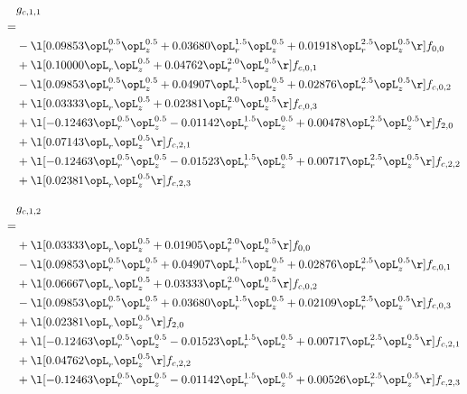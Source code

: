 \begin{alignat}{2} 
\label{eq:g_11_0} 
& g_{c,1,1} \nonumber \\ 
 = \\ 
& - \l[  0.09853 \opL_r^{0.5} \opL_z^{0.5} +  0.03680 \opL_r^{1.5} \opL_z^{0.5} +  0.01918 \opL_r^{2.5} \opL_z^{0.5}  \r] f_{0,0} \nonumber \\ 
& + \l[  0.10000 \opL_r \opL_z^{0.5} +  0.04762 \opL_r^{2.0} \opL_z^{0.5}  \r] f_{c,0,1} \nonumber \\ 
& - \l[  0.09853 \opL_r^{0.5} \opL_z^{0.5} +  0.04907 \opL_r^{1.5} \opL_z^{0.5} +  0.02876 \opL_r^{2.5} \opL_z^{0.5}  \r] f_{c,0,2} \nonumber \\ 
& + \l[  0.03333 \opL_r \opL_z^{0.5} +  0.02381 \opL_r^{2.0} \opL_z^{0.5}  \r] f_{c,0,3} \nonumber \\ 
& + \l[  -0.12463 \opL_r^{0.5} \opL_z^{0.5}   -0.01142 \opL_r^{1.5} \opL_z^{0.5} +  0.00478 \opL_r^{2.5} \opL_z^{0.5}  \r] f_{2,0} \nonumber \\ 
& + \l[  0.07143 \opL_r \opL_z^{0.5}  \r] f_{c,2,1} \nonumber \\ 
& + \l[  -0.12463 \opL_r^{0.5} \opL_z^{0.5}   -0.01523 \opL_r^{1.5} \opL_z^{0.5} +  0.00717 \opL_r^{2.5} \opL_z^{0.5}  \r] f_{c,2,2} \nonumber \\ 
& + \l[  0.02381 \opL_r \opL_z^{0.5}  \r] f_{c,2,3} \nonumber \\ 
\end{alignat} 


\begin{alignat}{2} 
\label{eq:g_12_0} 
& g_{c,1,2} \nonumber \\ 
 = \\ 
& + \l[  0.03333 \opL_r \opL_z^{0.5} +  0.01905 \opL_r^{2.0} \opL_z^{0.5}  \r] f_{0,0} \nonumber \\ 
& - \l[  0.09853 \opL_r^{0.5} \opL_z^{0.5} +  0.04907 \opL_r^{1.5} \opL_z^{0.5} +  0.02876 \opL_r^{2.5} \opL_z^{0.5}  \r] f_{c,0,1} \nonumber \\ 
& + \l[  0.06667 \opL_r \opL_z^{0.5} +  0.03333 \opL_r^{2.0} \opL_z^{0.5}  \r] f_{c,0,2} \nonumber \\ 
& - \l[  0.09853 \opL_r^{0.5} \opL_z^{0.5} +  0.03680 \opL_r^{1.5} \opL_z^{0.5} +  0.02109 \opL_r^{2.5} \opL_z^{0.5}  \r] f_{c,0,3} \nonumber \\ 
& + \l[  0.02381 \opL_r \opL_z^{0.5}  \r] f_{2,0} \nonumber \\ 
& + \l[  -0.12463 \opL_r^{0.5} \opL_z^{0.5}   -0.01523 \opL_r^{1.5} \opL_z^{0.5} +  0.00717 \opL_r^{2.5} \opL_z^{0.5}  \r] f_{c,2,1} \nonumber \\ 
& + \l[  0.04762 \opL_r \opL_z^{0.5}  \r] f_{c,2,2} \nonumber \\ 
& + \l[  -0.12463 \opL_r^{0.5} \opL_z^{0.5}   -0.01142 \opL_r^{1.5} \opL_z^{0.5} +  0.00526 \opL_r^{2.5} \opL_z^{0.5}  \r] f_{c,2,3} \nonumber \\ 
\end{alignat} 


